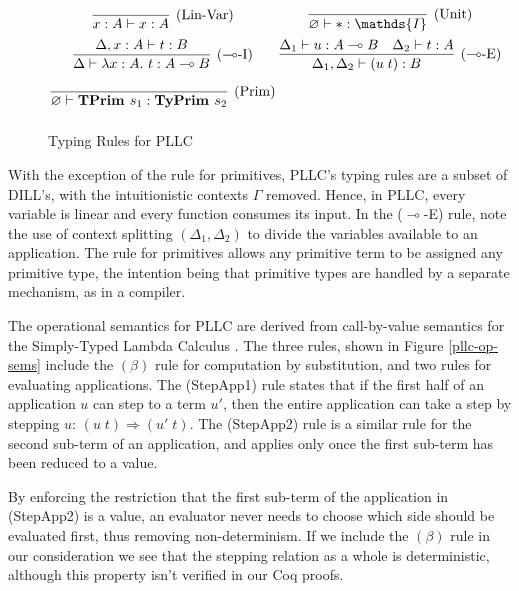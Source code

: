 \documentclass[]{unswthesis}
\let\emptyset\varnothing
\newcommand{\lam}[1]{\lambda #1 \ldotp \,}
\newcommand{\app}[2]{(#1 \; #2)}
\newcommand{\lolly}{\multimap}
\newcommand{\types}{\vdash}
\newcommand{\steps}{\Rightarrow}
\newcommand{\TyPrim}[1]{\b{TyPrim } #1}
\newcommand{\TPrim}[1]{\b{TPrim } #1}
\let\b\textbf
\let\t\text
\begin{document}
\begin{figure}[h]
\caption{Typing Rules for PLLC}
\label{pllc-typing-rules}
\begin{displaymath}
\arraycolsep=1.4pt\def\arraystretch{2.2}
\begin{array}{cc}
\infer[\text{(Lin-Var)}]{x : A \types x : A}{} &
\infer[\text{(Unit)}]{\emptyset \types * : \mathds{I}}{} \\
\infer[\text{($\lolly$-I)}]
  {\Delta \types \lam{x : A} t : A \lolly B}
  {\Delta, x : A \types t : B} &
\infer[\text{($\lolly$-E)}]
  {\Delta_1, \Delta_2 \types \app{u}{t} : B}
  {\Delta_1 \types u : A \lolly B  & \Delta_2 \types t : A} \\
\infer[\t{(Prim)}]{\emptyset \types \TPrim{s_1} : \TyPrim{s_2}}{} \\
\end{array}
\end{displaymath}
\end{figure}

With the exception of the rule for primitives, PLLC's typing rules are a subset of DILL's, with the intuitionistic contexts $\Gamma$ removed. Hence, in PLLC, every variable is linear and every function consumes its input. In the ($\lolly$-E) rule, note the use of context splitting $(\Delta_1, \Delta_2)$ to divide the variables available to an application. The rule for primitives allows any primitive term to be assigned any primitive type, the intention being that primitive types are handled by a separate mechanism, as in a compiler.

The operational semantics for PLLC are derived from call-by-value semantics for the Simply-Typed Lambda Calculus \cite{pierce15}. The three rules, shown in Figure \ref{pllc-op-sems} include the $(\beta)$ rule for computation by substitution, and two rules for evaluating applications. The (StepApp1) rule states that if the first half of an application $u$ can step to a term $u'$, then the entire application can take a step by stepping $u$: $\app{u}{t} \steps \app{u'}{t}$. The (StepApp2) rule is a similar rule for the second sub-term of an application, and applies only once the first sub-term has been reduced to a value.

By enforcing the restriction that the first sub-term of the application in (StepApp2) is a value, an evaluator never needs to choose which side should be evaluated first, thus removing non-determinism. If we include the $(\beta)$ rule in our consideration we see that the stepping relation as a whole is deterministic, although this property isn't verified in our Coq proofs.
\end{document}

